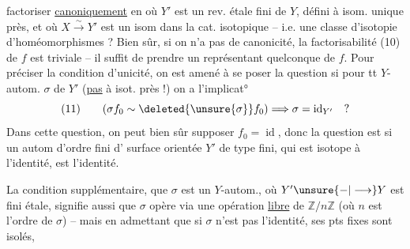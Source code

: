 factoriser \uline{canoniquement} en
où $Y'$ est un rev. étale fini de $Y$, défini à isom. unique près, et où $X\xrightarrow{\sim}Y'$ est un isom dans la cat. isotopique -- i.e. une classe d'isotopie d'homéomorphismes ? Bien sûr, si on n'a pas  de canonicité, la factorisabilité (10) de $f$ est triviale -- il suffit de prendre un représentant quelconque de $f$.  Pour préciser la  condition d'unicité, on est amené à se poser la question si pour tt $Y$-autom.  $\sigma$ de $Y'$  (\uline{pas} à isot. près !)  on a l'implicat°
\[
(11)\qquad (\sigma f_0\sim\deleted{\unsure{\sigma}}f_0)\Longrightarrow\sigma=\operatorname{id}_{Y'}\quad ?
\]
Dans cette question, on peut bien sûr supposer $f_0=\operatorname{id}$, donc la question est si un autom d'ordre fini \inserted{$\sigma$} d'  surface orientée $Y'$ de type fini, qui est isotope à l'identité, est l'identité.

La condition supplémentaire, que $\sigma$ est un $Y$-autom., où $Y'\unsure{-|\longrightarrow}Y$ est fini étale, signifie aussi que $\sigma$ opère via une opération \uline{libre} de $\mathbb{Z}/n\mathbb{Z}$ (où $n$ est l'ordre de $\sigma$) -- mais en admettant que si $\sigma$  n'est pas l'identité, ses pts fixes sont isolés,
